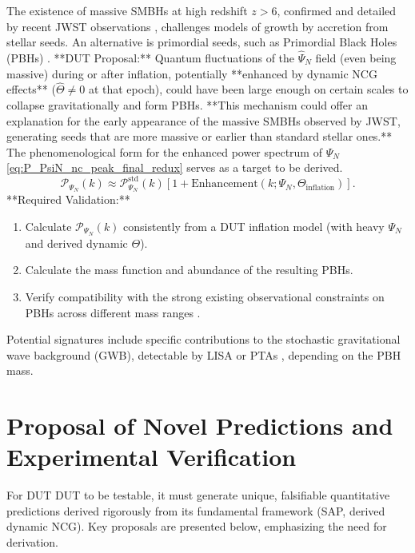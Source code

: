 \documentclass[11pt, a4paper]{article}
\theoremstyle{remark}
\newcommand{\Op}[1]{\hat{#1}}
\begin{document}
The existence of massive SMBHs at high redshift \(z > 6\), confirmed and detailed by recent JWST observations \citep[e.g.,][]{Labbe:2023}, challenges models of growth by accretion from stellar seeds. An alternative is primordial seeds, such as Primordial Black Holes (PBHs) \citep{CarrHawking1974PBH}.
**DUT Proposal:** Quantum fluctuations of the \( \Op{\Psi}_N \) field (even being massive) during or after inflation, potentially **enhanced by dynamic NCG effects** (\( \Op{\Theta} \neq 0 \) at that epoch), could have been large enough on certain scales to collapse gravitationally and form PBHs. **This mechanism could offer an explanation for the early appearance of the massive SMBHs observed by JWST, generating seeds that are more massive or earlier than standard stellar ones.** The phenomenological form for the enhanced power spectrum of \( \Psi_N \) \eqref{eq:P_PsiN_nc_peak_final_redux} serves as a target to be derived.
\begin{equation} \label{eq:P_PsiN_nc_peak_final_redux}
\mathcal{P}_{\Psi_N}(k) \approx \mathcal{P}_{\Psi_N}^{\text{std}}(k) \left[ 1 + \text{Enhancement}(k; \Psi_N, \Theta_{\text{inflation}}) \right].
\end{equation}
**Required Validation:**
\begin{enumerate}
    \item Calculate \( \mathcal{P}_{\Psi_N}(k) \) consistently from a DUT inflation model (with heavy \( \Psi_N \) and derived dynamic \( \Theta \)).
    \item Calculate the mass function and abundance of the resulting PBHs.
    \item Verify compatibility with the strong existing observational constraints on PBHs across different mass ranges \citep{Carr:2020gox}.
\end{enumerate}
Potential signatures include specific contributions to the stochastic gravitational wave background (GWB), detectable by LISA \citep{LISA:2017, Auclair2023LISA} or PTAs \citep{NANOGrav:2023gor}, depending on the PBH mass.

\section{Proposal of Novel Predictions and Experimental Verification}
\label{sec:novel_predictions_final_revised}

For DUT DUT to be testable, it must generate unique, falsifiable quantitative predictions derived rigorously from its fundamental framework (SAP, derived dynamic NCG). Key proposals are presented below, emphasizing the need for derivation.
\end{document}
